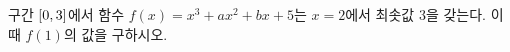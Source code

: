 구간 $[0{,}\mkern3mu\mathopen{}3]$에서 함수 $f(x)=x^3+ax^2+bx+5$는 $x=2$에서 최솟값 $3$을 갖는다. 이때 $f(1)$의 값을 구하시오. 
